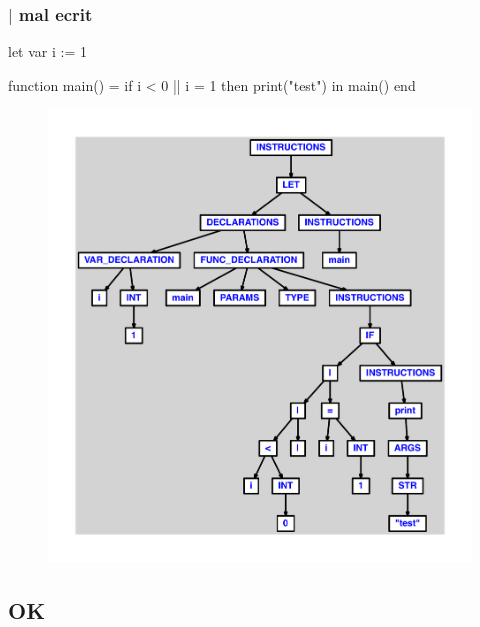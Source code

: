 \documentclass{article}
\begin{document}
\subsubsection{$ | $ mal ecrit}
\begin{verbatimtab}
let
	var i := 1

	function main() =
		if i < 0 || i = 1 then print("test")
in main() end
\end{verbatimtab}
\begin{figure}[H]\centering\includegraphics[max width=\textwidth]{ast/ast_272.pdf}\end{figure}\subsection{OK}
\end{document}
